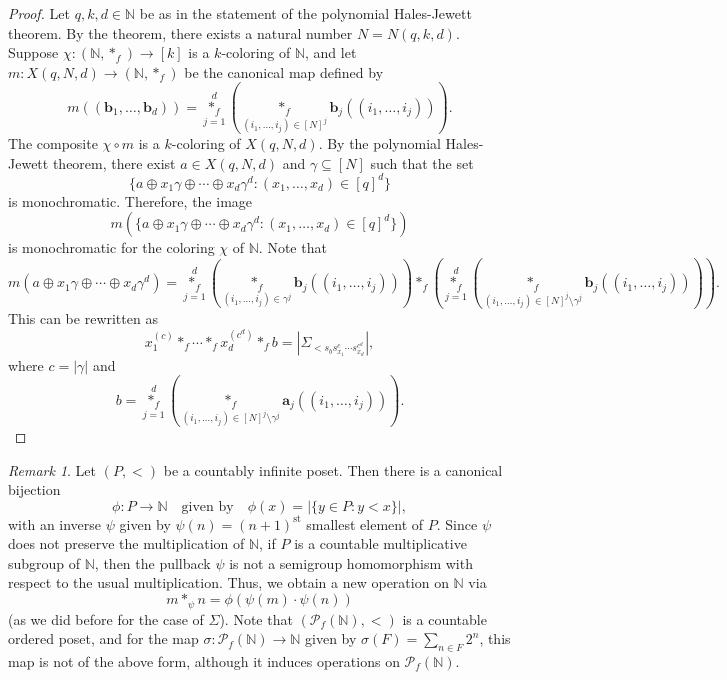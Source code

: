 \documentclass[12pt]{amsart}
\theoremstyle{plain}
\theoremstyle{definition}
\theoremstyle{remark}
\newtheorem{remark}[theorem]{Remark}
\numberwithin{equation}{section}
\begin{document}
\begin{proof}
Let \( q, k, d \in \mathbb{N} \) be as in the statement of the polynomial Hales-Jewett theorem. By the theorem, there exists a natural number \( N = N(q, k, d) \). Suppose \( \chi : (\mathbb{N}, \ast_f) \to [k] \) is a \( k \)-coloring of \( \mathbb{N} \), and let \( m : X(q, N, d) \to (\mathbb{N}, \ast_f) \) be the canonical map defined by
\[
m((\mathbf{b}_1, \dots, \mathbf{b}_d)) = \overset{d}{\underset{j=1}{\ast_f}} \left( \underset{(i_1, \dots, i_j) \in [N]^j}{\ast_f} \mathbf{b}_j((i_1, \dots, i_j)) \right).
\]
The composite \( \chi \circ m \) is a \( k \)-coloring of \( X(q, N, d) \). By the polynomial Hales-Jewett theorem, there exist \( a \in X(q, N, d) \) and \( \gamma \subseteq [N] \) such that the set
\[
\{ a \oplus x_1 \gamma \oplus \cdots \oplus x_d \gamma^d : (x_1, \dots, x_d) \in [q]^d \}
\]
is monochromatic. Therefore, the image
\[
m\left(\{ a \oplus x_1 \gamma \oplus \cdots \oplus x_d \gamma^d : (x_1, \dots, x_d) \in [q]^d \}\right)
\]
is monochromatic for the coloring \( \chi \) of \( \mathbb{N} \). Note that
\[
m(a \oplus x_1 \gamma \oplus \cdots \oplus x_d \gamma^d) = \overset{d}{\underset{j=1}{\ast_f}} \left( \underset{(i_1, \dots, i_j) \in \gamma^j}{\ast_f} \mathbf{b}_j((i_1, \dots, i_j)) \right) \ast_f \left( \overset{d}{\underset{j=1}{\ast_f}} \left( \underset{(i_1, \dots, i_j) \in [N]^j \setminus \gamma^j}{\ast_f} \mathbf{b}_j((i_1, \dots, i_j)) \right) \right).
\]
This can be rewritten as
\[
x_1^{(c)} \ast_f \cdots \ast_f x_d^{(c^d)} \ast_f b = |\Sigma_{<  s_b s_{x_1}^{c} \cdots s_{x_d}^{c^d}}|,
\]
where \( c = |\gamma| \) and
\[
b = \overset{d}{\underset{j=1}{\ast_f}} \left( \underset{(i_1, \dots, i_j) \in [N]^j \setminus \gamma^j}{\ast_f} \mathbf{a}_j((i_1, \dots, i_j)) \right).
\]
\end{proof}




\begin{remark}
Let \( (P, <) \) be a countably infinite poset. Then there is a canonical bijection
\[
\phi : P \to \mathbb{N} \quad \text{given by} \quad \phi(x) = |\{ y \in P : y < x \}|,
\]
with an inverse \( \psi \) given by \( \psi(n) = (n+1)^{\text{st}} \) smallest element of \( P \). Since \( \psi \) does not preserve the multiplication of \( \mathbb{N} \), if \( P \) is a countable multiplicative subgroup of \( \mathbb{N} \), then the pullback \( \psi \) is not a semigroup homomorphism with respect to the usual multiplication. Thus, we obtain a new operation on \( \mathbb{N} \) via
\[
m \ast_\psi n = \phi(\psi(m) \cdot \psi(n))
\]
(as we did before for the case of \( \Sigma \)). Note that \( (\mathcal{P}_f(\mathbb{N}), <) \) is a countable ordered poset, and for the map \( \sigma : \mathcal{P}_f(\mathbb{N}) \to \mathbb{N} \) given by \( \sigma(F) = \sum_{n \in F} 2^n \), this map is not of the above form, although it induces operations on \( \mathcal{P}_f(\mathbb{N}) \).
\end{remark}
\end{document}
